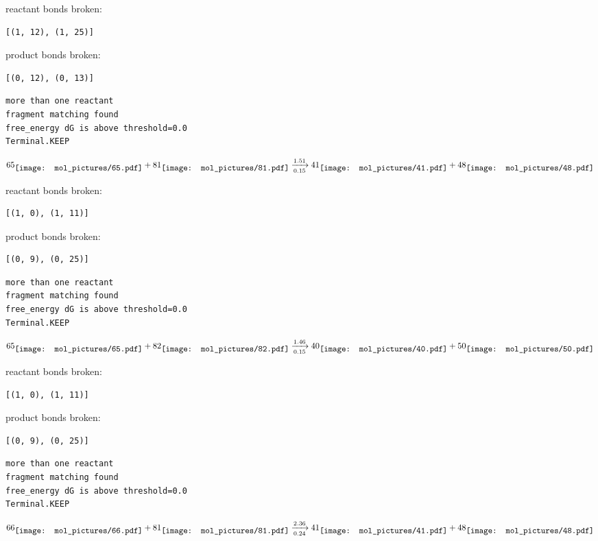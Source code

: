 \documentclass{article}
\begin{document}
reactant bonds broken:\begin{verbatim}
[(1, 12), (1, 25)]
\end{verbatim}
product bonds broken:\begin{verbatim}
[(0, 12), (0, 13)]
\end{verbatim}




\vspace{1cm}
\begin{verbatim}
more than one reactant
fragment matching found
free_energy dG is above threshold=0.0
Terminal.KEEP
\end{verbatim}
$$
65
\raisebox{-.5\height}{\texttt{[image: mol\_pictures/65.pdf]}}
+
81
\raisebox{-.5\height}{\texttt{[image: mol\_pictures/81.pdf]}}
\xrightarrow[0.15]{1.51}
41
\raisebox{-.5\height}{\texttt{[image: mol\_pictures/41.pdf]}}
+
48
\raisebox{-.5\height}{\texttt{[image: mol\_pictures/48.pdf]}}
$$


reactant bonds broken:\begin{verbatim}
[(1, 0), (1, 11)]
\end{verbatim}
product bonds broken:\begin{verbatim}
[(0, 9), (0, 25)]
\end{verbatim}




\vspace{1cm}
\begin{verbatim}
more than one reactant
fragment matching found
free_energy dG is above threshold=0.0
Terminal.KEEP
\end{verbatim}
$$
65
\raisebox{-.5\height}{\texttt{[image: mol\_pictures/65.pdf]}}
+
82
\raisebox{-.5\height}{\texttt{[image: mol\_pictures/82.pdf]}}
\xrightarrow[0.15]{1.46}
40
\raisebox{-.5\height}{\texttt{[image: mol\_pictures/40.pdf]}}
+
50
\raisebox{-.5\height}{\texttt{[image: mol\_pictures/50.pdf]}}
$$


reactant bonds broken:\begin{verbatim}
[(1, 0), (1, 11)]
\end{verbatim}
product bonds broken:\begin{verbatim}
[(0, 9), (0, 25)]
\end{verbatim}




\vspace{1cm}
\begin{verbatim}
more than one reactant
fragment matching found
free_energy dG is above threshold=0.0
Terminal.KEEP
\end{verbatim}
$$
66
\raisebox{-.5\height}{\texttt{[image: mol\_pictures/66.pdf]}}
+
81
\raisebox{-.5\height}{\texttt{[image: mol\_pictures/81.pdf]}}
\xrightarrow[0.24]{2.36}
41
\raisebox{-.5\height}{\texttt{[image: mol\_pictures/41.pdf]}}
+
48
\raisebox{-.5\height}{\texttt{[image: mol\_pictures/48.pdf]}}
$$
\end{document}
